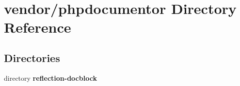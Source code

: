 \section{vendor/phpdocumentor Directory Reference}
\label{dir_b48c13e123b4719dfb8c46389921ce38}
\subsection*{Directories}
\begin{DoxyCompactItemize}
\item 
directory {\bf reflection-\/docblock}
\end{DoxyCompactItemize}
